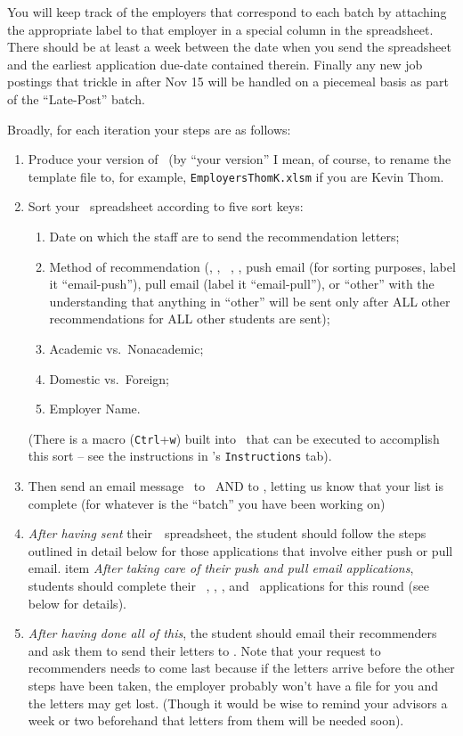 \documentclass{\econtex}
\begin{document}
    You will keep track of the employers that correspond to each batch 
by attaching the appropriate label to that employer in a special
column in the spreadsheet.  There should be at 
least a week between the date when you send the spreadsheet and the
earliest application due-date contained therein.  Finally any new job postings
that trickle in after Nov 15 will be handled on a piecemeal basis
as part of the ``Late-Post'' batch.

Broadly, for each iteration your steps are as follows:
\begin{enumerate}
\item Produce your version of \EMtt~(by ``your version'' I mean, of
  course, to rename the template file to, for example,
  \texttt{EmployersThomK.xlsm} if you are Kevin Thom. 
  
\item Sort your \EMtt~spreadsheet according to five sort keys:
  \begin{enumerate} 
  \item Date on which the staff are to send the recommendation letters; 
  \item Method of recommendation (\AEA, \AJO, {\EJM}~, \Interfolio, push email (for sorting purposes,
    label it ``email-push''), pull email (label it ``email-pull''), or
    ``other'' with the understanding that anything in ``other'' will be
    sent only after ALL other recommendations for ALL other students are
    sent);
  \item Academic vs.\ Nonacademic;
  \item Domestic vs.\ Foreign;
  \item Employer Name. 
  \end{enumerate} 

  (There is a macro (\texttt{Ctrl}+\texttt{w}) built into \EMtt~that can be
  executed to accomplish this sort -- see the instructions in
  \EMtt's \texttt{Instructions} tab).


\item Then send an email message {\EMtt}~to {\jmstaffemail}~AND to {\JMPOEmail}, letting us know that your list is complete (for whatever is the ``batch'' you have been working on)

\item \textit{After having sent} their~{\EMW}~spreadsheet, the student
  should follow the steps outlined in detail below for those
  applications that involve either push or pull email.
  item \textit{After taking care of their push and pull email applications}, students should complete their {\EJM}~, \AJO, \AEA, and \Interfolio~applications for this round (see below for details).

\item \textit{After having done all of this}, the student should email their recommenders and ask them to send their letters to {\jmstaffemail}.  Note that your request to recommenders needs to come last because if the letters arrive before the other steps have been taken, the employer probably won't have a file for you and the letters may get lost.  (Though it would be wise to remind your advisors a week or two beforehand that letters from them will be needed soon).

\end{enumerate}
\end{document}
